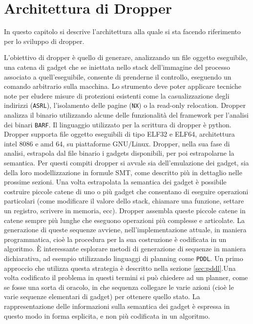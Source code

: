\chapter{Architettura di Dropper}
\label{cap:architettura}

In questo capitolo si descrive l'architettura alla quale si sta
facendo riferimento per lo sviluppo di dropper.

L'obiettivo di dropper è quello di generare, analizzando un file
oggetto eseguibile, una catena di gadget che se iniettata nello stack
dell'immagine del processo associato a quell'eseguibile, consente di
prenderne il controllo, eseguendo un comando arbitrario sulla
macchina. Lo strumento deve poter applicare tecniche note per eludere
misure di protezioni esistenti come la casualizzazione degli indirizzi
(\lstinline{ASRL}), l'isolamento delle pagine (\lstinline{NX}) o la
read-only relocation. Dropper analizza il binario utilizzando alcune
delle funzionalità del framework per l'analisi dei binari
\lstinline{BARF}. Il linguaggio utilizzato per la scrittura di dropper
è python. Dropper supporta file oggetto eseguibili di tipo ELF32 e
ELF64, architettura intel 8086 e amd 64, su piattaforme
GNU/Linux. Dropper, nella sua fase di analisi, estrapola dal file
binario i gadgets disponibili, per poi estrapolarne la semantica. Per
questi compiti dropper si avvale sia dell'emulazione dei gadget, sia
della loro modellizzazione in formule SMT, come descritto più in
dettaglio nelle prossime sezioni. Una volta estrapolata la semantica
dei gadget è possibile costruire piccole catene di uno o più gadget
che consentano di eseguire operazioni particolari (come modificare il
valore dello stack, chiamare una funzione, settare un registro,
scrivere in memoria, ecc). Dropper assembla queste piccole catene in
catene sempre più lunghe che eseguono operazioni più complesse e
articolate. La generazione di queste sequenze avviene,
nell'implementazione attuale, in maniera programmatica, cioè la
procedura per la sua costruzione è codificata in un algoritmo. È
interessante esplorare metodi di generazione di sequenze in maniera
dichiarativa, ad esempio utilizzando linguaggi di planning come
\lstinline{PDDL}\cite{pddl-97}. Un primo approccio che utilizza questa
strategia è descritto nella sezione \ref{sec:pddl}.Una volta
codificato il problema in questi termini si può chiedere ad un
planner, come se fosse una sorta di oracolo, in che sequenza collegare
le varie azioni (cioè le varie sequenze elementari di gadget) per
ottenere quello stato. La rappresentazione delle informazioni sulla
semantica dei gadget è espressa in questo modo in forma esplicita, e
non più codificata in un algoritmo.

